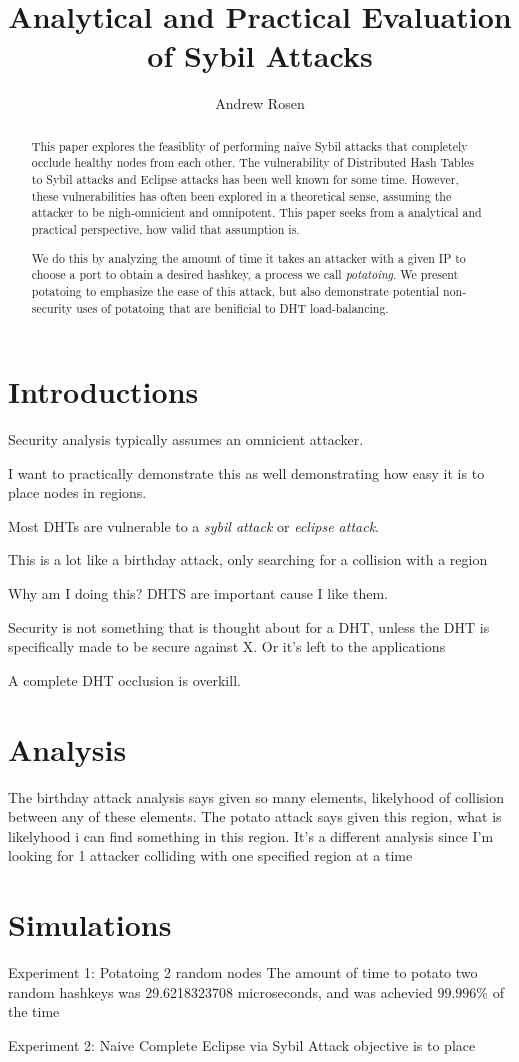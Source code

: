 \documentclass[10pt,a4paper]{article}
\author{Andrew Rosen}
\title{Analytical and Practical Evaluation of Sybil Attacks}
\begin{document}
\maketitle

\begin{abstract}
This paper explores the feasiblity of performing naive Sybil attacks that completely occlude healthy nodes from each other.
The vulnerability of Distributed Hash Tables to Sybil attacks and Eclipse attacks has been well known for some time.
However, these vulnerabilities has often been explored in a theoretical sense, assuming the attacker to be nigh-omnicient and omnipotent. 
This paper seeks from a analytical and practical perspective, how valid that assumption is.


We do this by analyzing the amount of time it takes an attacker with a given IP to choose a port to obtain a desired hashkey, a process we call \emph{potatoing}.
We present potatoing to emphasize the ease of this attack, but also demonstrate potential non-security uses of potatoing that are benificial to DHT load-balancing. 
\end{abstract}

\section{Introductions}
Security analysis typically assumes an omnicient attacker. 

I want to practically demonstrate this as well demonstrating how easy it is to place nodes in regions.

Most DHTs are vulnerable to a \textit{sybil attack} or \textit{eclipse attack}.


This is a lot like a birthday attack, only searching for a collision with a region


Why am I doing this?
DHTS are important cause I like them.

Security is not something that is thought about for a DHT, unless the 
DHT is specifically made to be secure against X.  
Or it's left to the applications


A complete DHT occlusion is overkill.
\section{Analysis}

The birthday attack analysis says given so many elements, likelyhood of collision between any of these elements.
The potato attack says given this region, what is likelyhood i can find something in this region.  
It's a different analysis since I'm looking for 1 attacker colliding with one specified region at a time 


\section{Simulations}

Experiment 1: Potatoing 2 random nodes
The amount of time to potato two random hashkeys was 29.6218323708 microseconds, and was achevied $ 99.996\%$ of the time



Experiment 2:  Naive Complete Eclipse via Sybil
Attack objective is to place
\end{document}
